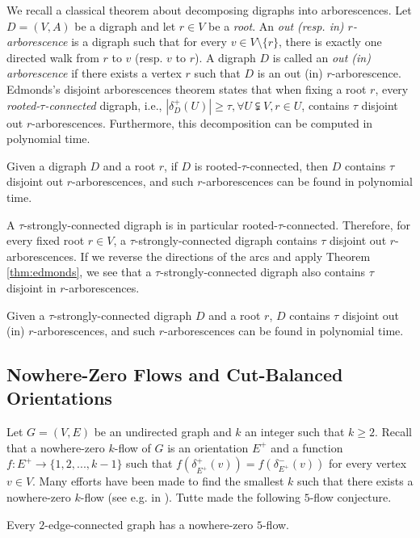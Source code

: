 \documentclass[runningheads]{llncs}
\begin{document}
We recall a classical theorem about decomposing digraphs into arborescences.
Let $D=(V,A)$ be a digraph and let $r\in V$ be a \textit{root}. An \textit{out (resp. in) $r$-arborescence} is 
a digraph such that for every $v\in V\setminus \{r\}$, there is exactly one directed walk from $r$ to $v$ (resp. $v$ to $r$). A digraph $D$ is called an \textit{out (in) arborescence} if there exists a vertex $r$ such that $D$ is an out (in) $r$-arborescence. Edmonds's disjoint arborescences theorem \cite{edmonds1973edge} states that when fixing a root $r$, every \textit{rooted-$\tau$-connected} digraph, i.e., $|\delta_D^+(U)|\geq \tau, \forall U\subsetneqq V, r\in U$, contains $\tau$ disjoint out $r$-arborescences. Furthermore, this decomposition can be computed in polynomial time.
\begin{theorem}\label{thm:edmonds}
    Given a digraph $D$ and a root $r$, if $D$ is rooted-$\tau$-connected, then $D$ contains $\tau$ disjoint out $r$-arborescences, and such $r$-arborescences can be found in polynomial time.
\end{theorem}

A $\tau$-strongly-connected digraph is in particular rooted-$\tau$-connected. Therefore, for every fixed root $r\in V$, a $\tau$-strongly-connected digraph contains $\tau$ disjoint out $r$-arborescences. If we reverse the directions of the arcs and apply Theorem \ref{thm:edmonds}, we see that a $\tau$-strongly-connected digraph also contains $\tau$ disjoint in $r$-arborescences. 


\begin{corollary}\label{cor:edmonds}
     Given a $\tau$-strongly-connected digraph $D$ and a root $r$, $D$ contains $\tau$ disjoint out (in) $r$-arborescences,  and such $r$-arborescences can be found in polynomial time.
\end{corollary}



\subsection{Nowhere-Zero Flows and Cut-Balanced Orientations}
Let $G=(V,E)$ be an undirected graph and $k$ an integer such that $k\geq 2$. Recall that a nowhere-zero $k$-flow of $G$ is an orientation $E^+$ and a function $f:E^+ \rightarrow \{1,2,...,k-1\}$ such that $f(\delta_{E^+}^+(v))=f(\delta_{E^+}^-(v))$ for every vertex $v \in V$. 
Many efforts have been made to find the smallest $k$ such that there exists a nowhere-zero $k$-flow (see e.g. in \cite{jaeger1988nowhere}). Tutte made the following $5$-flow conjecture.
\begin{conjecture}\label{conj:5-flow}
    Every $2$-edge-connected graph has a nowhere-zero $5$-flow.
\end{conjecture}
\end{document}
